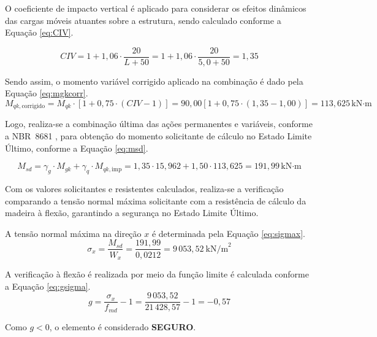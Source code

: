 O coeficiente de impacto vertical é aplicado para considerar os efeitos dinâmicos das cargas móveis atuantes sobre a estrutura, sendo calculado conforme a Equação \eqref{eq:CIV}.

\begin{equation}
CIV = 1 + 1{,}06 \cdot\frac{20}{L+50}
    = 1 + 1{,}06 \cdot \frac{20}{5{,}0 + 50}
    = 1{,}35
\label{eq:CIV}
\end{equation}

Sendo assim, o momento variável corrigido aplicado na combinação é dado pela Equação \eqref{eq:mgkcorr}.
\begin{equation}
M_{qk,\text{corrigido}} = M_{qk} \cdot [1 + 0{,}75 \cdot (CIV-1)]
                  = 90{,}00[1 + 0{,}75 \cdot (1{,}35 - 1{,}00)]
                  = 113{,}625\,\text{kN·m}
\label{eq:mgkcorr}                  
\end{equation}

Logo, realiza-se a combinação última das ações permanentes e variáveis, conforme a NBR~8681 \parencite{NBR8681:2025}, para obtenção do momento solicitante de cálculo no Estado Limite Último, conforme a Equação \eqref{eq:msd}.

\begin{equation}
M_{sd} = \gamma_g \cdot M_{gk} + \gamma_q \cdot M_{qk,\text{imp}}
       = 1{,}35\cdot15{,}962 + 1{,}50\cdot 113{,}625
       = 191{,}99\,\text{kN·m}
\label{eq:msd}
\end{equation}

Com os valores solicitantes e resistentes calculados, realiza-se a verificação comparando a tensão normal máxima solicitante com a resistência de cálculo da madeira à flexão, garantindo a segurança no Estado Limite Último.

A tensão normal máxima na direção $x$ é determinada pela Equação \eqref{eq:sigmax}.
\begin{equation}
\sigma_x = \frac{M_{sd}}{W_x}
         = \frac{191{,}99}{0{,}0212}
         = 9\,053{,}52\ \text{kN/m}^2
\label{eq:sigmax}
\end{equation}

A verificação à flexão é realizada por meio da função limite é calculada conforme a Equação \eqref{eq:gsigma}.
\begin{equation}
g = \frac{\sigma_x}{f_{md}} - 1
  = \frac{9\,053{,}52}{21\,428{,}57} - 1
  = -0{,}57
\label{eq:gsigma}
\end{equation}

Como $g < 0$, o elemento é considerado \textbf{SEGURO}.

